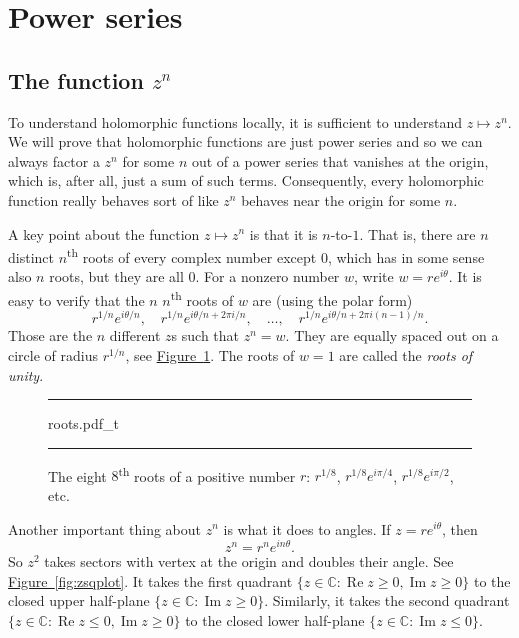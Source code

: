 \documentclass[12pt,openany]{book}
\renewcommand{\Re}{\operatorname{Re}}
\renewcommand{\Im}{\operatorname{Im}}
\newcommand{\C}{{\mathbb{C}}}
\newcommand{\myindex}[1]{#1\index{#1}}
\theoremstyle{plain}
\theoremstyle{remark}
\theoremstyle{definition}
\newenvironment{myfig}{%
\begin{figure}[h!t]
\noindent\rule{\textwidth}{0.5pt}\vspace{12pt}\par\centering}%
{\par\noindent\rule{\textwidth}{0.5pt}
\end{figure}}
\theoremstyle{exercise}
\theoremstyle{example}
\newcommand{\figureref}[1]{\hyperref[#1]{Figure~\ref*{#1}}}
\begin{document}

\section{Power series}
\label{sec:powerser}

\subsection{The function \texorpdfstring{$z^n$}{z to the n}}

To understand holomorphic functions locally, 
it is sufficient to understand $z \mapsto z^n$.  We will prove that
holomorphic functions are just power series and so we can always factor
a $z^n$ for some $n$ out of a power series that vanishes at the origin,
which is, after all, just a sum of such terms.  Consequently, every holomorphic
function really behaves sort of like $z^n$ behaves near the origin for some $n$.

A key point about the function $z \mapsto z^n$ is that it is $n$-to-$1$.
That is, there are $n$ distinct $n$\textsuperscript{th} roots of every complex
number except $0$,
which has in some sense also $n$ roots, but they are all $0$.  For a nonzero
number $w$, write $w = re^{i\theta}$.  It is easy to verify that
the $n$ $n$\textsuperscript{th} roots of $w$ are 
(using the polar form)
\begin{equation*}
r^{1/n} e^{i\theta/n}
, \quad
r^{1/n} e^{i\theta/n + 2\pi i /n}
, \quad \ldots, \quad
r^{1/n} e^{i\theta/n + 2\pi i (n-1)/n} .
\end{equation*}
Those are the $n$ different $z$s such that $z^n=w$.  They are equally
spaced out on a circle of radius $r^{1/n}$, see
\figureref{fig:roots}.  The roots of $w=1$ are
called the \emph{\myindex{roots of unity}}.

\begin{myfig}
{roots.pdf_t}
\caption{The eight $8$\textsuperscript{th} roots of a positive number $r$:
$r^{1/8}$, $r^{1/8} e^{i \pi / 4}$,  $r^{1/8} e^{i \pi / 2}$,
etc.\label{fig:roots}}
\end{myfig}

Another important thing about $z^n$ is what it does to angles.
If $z = re^{i\theta}$, then
\begin{equation*}
z^n = r^n e^{i n\theta} .
\end{equation*}
So $z^2$ takes sectors with vertex at the origin and doubles their angle.
See \figureref{fig:zsqplot}.
It takes the first quadrant
$\{ z \in \C : \Re z \geq 0, \Im z \geq 0 \}$
to the closed upper half-plane $\{ z \in \C : \Im z \geq 0 \}$.
Similarly, it takes the second quadrant
$\{ z \in \C : \Re z \leq 0, \Im z \geq 0 \}$
to the closed lower half-plane $\{ z \in \C : \Im z \leq 0 \}$.
\end{document}
